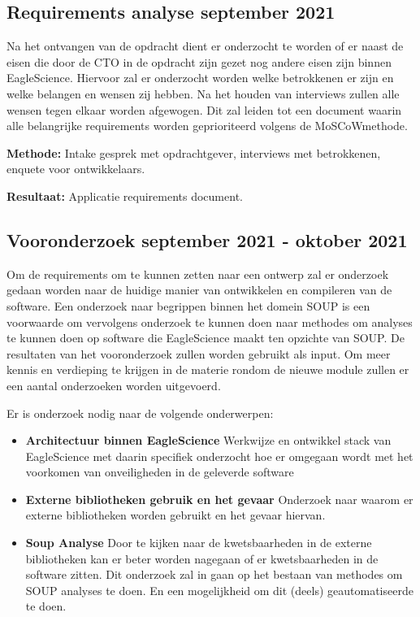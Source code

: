 \subsection{Requirements analyse \textbf{september 2021}}\label{subsec:requirements-analyse}
Na het ontvangen van de opdracht dient er onderzocht te worden of er naast de eisen die door de CTO in de opdracht zijn gezet nog andere eisen zijn binnen EagleScience. Hiervoor zal er onderzocht worden welke betrokkenen er zijn en welke belangen en wensen zij hebben. Na het houden van interviews zullen alle wensen tegen elkaar worden afgewogen. Dit zal leiden tot een document waarin alle belangrijke requirements worden geprioriteerd volgens de MoSCoW\-methode.

\textbf{Methode:} Intake gesprek met opdrachtgever, interviews met betrokkenen, enquete voor ontwikkelaars.

\textbf{Resultaat:} Applicatie requirements document.

\subsection{Vooronderzoek \textbf{september 2021 - oktober 2021 }}\label{subsec:onderzoek}
Om de requirements om te kunnen zetten naar een ontwerp zal er onderzoek gedaan worden naar de huidige manier van ontwikkelen en compileren van de software. Een onderzoek naar begrippen binnen het domein SOUP is een voorwaarde om vervolgens onderzoek te kunnen doen naar methodes om analyses te kunnen doen op software die EagleScience maakt ten opzichte van SOUP. De resultaten van het vooronderzoek zullen worden gebruikt als input.
Om meer kennis en verdieping te krijgen in de materie rondom de nieuwe module zullen er een aantal onderzoeken worden uitgevoerd.


Er is onderzoek nodig naar de volgende onderwerpen:
\begin{itemize}
    \item \textbf{Architectuur binnen EagleScience} Werkwijze en ontwikkel stack van EagleScience met daarin specifiek onderzocht hoe er omgegaan wordt met het voorkomen van onveiligheden in de geleverde software
    \item \textbf{Externe bibliotheken gebruik en het gevaar} Onderzoek naar waarom er externe bibliotheken worden gebruikt en het gevaar hiervan.
    \item \textbf{Soup Analyse} Door te kijken naar de kwetsbaarheden in de externe bibliotheken kan er beter worden nagegaan of er kwetsbaarheden in de software zitten. Dit onderzoek zal in gaan op het bestaan van methodes om SOUP analyses te doen. En een mogelijkheid om dit (deels) geautomatiseerde te doen.
\end{itemize}

